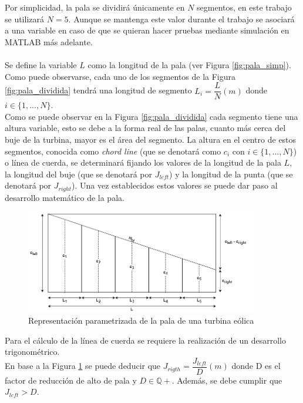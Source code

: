 Por simplicidad, la pala se dividirá únicamente en $N$ segmentos, en este trabajo se utilizará $N=5$. Aunque se mantenga este valor durante el trabajo se asociará a una variable en caso de que se quieran hacer pruebas mediante simulación en MATLAB más adelante. \\\\
    

Se define la variable $L$ como la longitud de la pala (ver Figura \ref{fig:pala_simp}). Como puede observarse, cada uno de los segmentos de la Figura \ref{fig:pala_dividida} tendrá una longitud de segmento $L_i = \dfrac{L}{N} (m)$ donde $i \in \{1,...,N\}$.\\

Como se puede observar en la Figura \ref{fig:pala_dividida} cada segmento tiene una altura variable, esto se debe a la forma real de las palas, cuanto más cerca del buje de la turbina, mayor es el área del segmento. La altura en el centro de estos segmentos, conocida como \textit{chord line} (que se denotará como $c_i$ con $i \in \{1, ...,N\}$) o línea de cuerda, se determinará fijando los valores de la longitud de la pala $L$, la longitud del buje (que se denotará por $J_{left}$) y la longitud de la punta (que se denotará por $J_{right}$). Una vez establecidos estos valores se puede dar paso al desarrollo matemático de la pala.\\

\begin{figure}[H]
    \centering
    \includegraphics[width=0.9\textwidth]{images/planteo chord line.png}
    \caption{Representación parametrizada de la pala de una turbina eólica}
    
    \label{fig:pala_desarrollo_chord}
\end{figure}

Para el cálculo de la línea de cuerda se requiere la realización de un desarrollo trigonométrico. \\

En base a la Figura \ref{fig:pala_desarrollo_chord} se puede deducir que
$J_{rigth} = \dfrac{J_{left}}{D} (m)$ donde D es el factor de reducción de alto de pala y $D \in \mathbb{Q+}$. Además, se debe cumplir que $J_{left} > D$.\\

